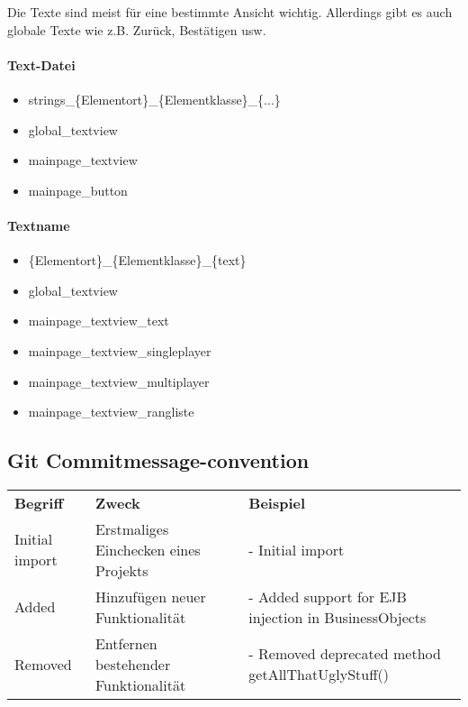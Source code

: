 Die Texte sind meist für eine bestimmte Ansicht wichtig. Allerdings gibt es auch globale Texte wie z.B. Zurück, Bestätigen usw.

\paragraph{Text-Datei}

\begin{itemize}
	\item strings\_\{Elementort\}\_\{Elementklasse\}\_\{...\}
\end{itemize}

\begin{itemize}
\item global\_textview
\item mainpage\_textview
\item mainpage\_button
\end{itemize}

\paragraph{Textname}

\begin{itemize}
	\item \{Elementort\}\_\{Elementklasse\}\_\{text\}
\end{itemize} 

\begin{itemize}
	\item global\_textview
	\item mainpage\_textview\_text
	\item mainpage\_textview\_singleplayer
	\item mainpage\_textview\_multiplayer
	\item mainpage\_textview\_rangliste
	
\end{itemize}

\subsection{Git Commitmessage-convention}

\begin{table}[H]
\begin{tabular}{|l|p{5cm}|p{9cm}|}
\hline
\textbf{Begriff} & \textbf{Zweck} & \textbf{Beispiel} \\
Initial import & Erstmaliges Einchecken eines Projekts & - Initial import \\
\hline
Added          & Hinzufügen neuer Funktionalität &  - Added support for 
														EJB injection in BusinessObjects\\
\hline
Removed        & Entfernen bestehender Funktionalität & - Removed 
														deprecated method 
														getAllThatUglyStuff() \\
\hline
\end{tabular}
\end{table}

